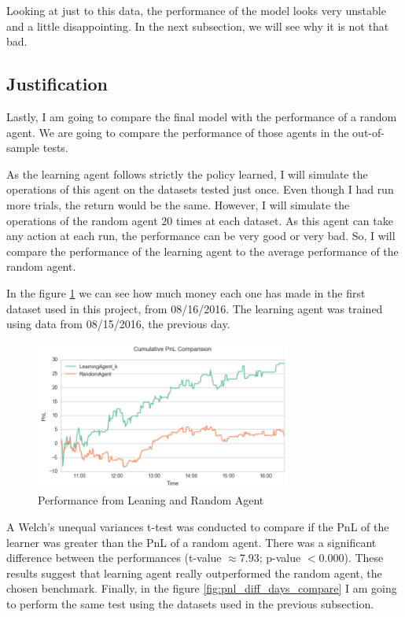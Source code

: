 \documentclass[a4paper]{article}
\begin{document}
Looking at just to this data, the performance of the model looks very unstable and a little disappointing. In the next subsection, we will see why it is not that bad.


\subsection{Justification}
Lastly, I am going to compare the final model with the performance of a random agent. We are going to compare the performance of those agents in the out-of-sample tests.

As the learning agent follows strictly the policy learned, I will simulate the operations of this agent on the datasets tested just once. Even though I had run more trials, the return would be the same. However, I will simulate the operations of the random agent $20$ times at each dataset. As this agent can take any action at each run, the performance can be very good or very bad. So, I will compare the performance of the learning agent to the average performance of the random agent.

In the figure \ref{fig:optimal_vs_random_pnl} we can see how much money each one has made in the first dataset used in this project, from 08/16/2016. The learning agent was trained using data from 08/15/2016, the previous day.

\begin{figure}[ht]
\centering
\includegraphics[width=0.75\textwidth]{figures/optimal_vs_random_pnl.png}
\caption{\label{fig:optimal_vs_random_pnl}Performance from Leaning and Random Agent}
\end{figure}

A Welch's unequal variances t-test was conducted to compare if the PnL of the learner was greater than the PnL of a random agent. There was a significant difference between the performances (t-value $\approx 7.93$;  p-value $< 0.000$). These results suggest that learning agent really outperformed the random agent, the chosen benchmark. Finally, in the figure \ref{fig:pnl_diff_days_compare} I am going to perform the same test using the datasets used in the previous subsection.
\end{document}
